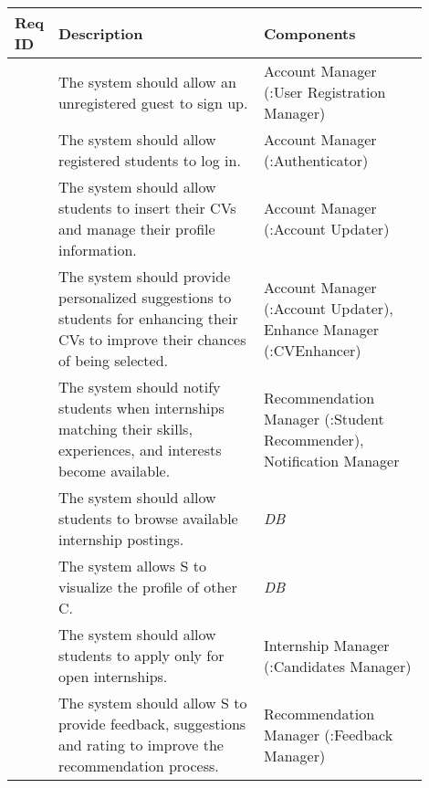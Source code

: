 \begin{center}
    \begin{longtable}{|l|p{0.5\linewidth}|p{0.4\linewidth}|}
        \hline
        \textbf{Req ID} & \textbf{Description} & \textbf{Components} \\
        \hline
        [R\creq] & The system should allow an unregistered guest to sign up. & Account Manager \newline (:User Registration Manager)\\
        \hline
        [R\creq] & The system should allow registered students to log in. & Account Manager \newline (:Authenticator)\\
        \hline
        [R\creq] & The system should allow students to insert their CVs and manage their profile information. & Account Manager \newline (:Account Updater)\\
        \hline
        [R\creq] & The system should provide personalized suggestions to students for enhancing their CVs to improve their chances of being selected. & Account Manager \newline (:Account Updater), \newline Enhance Manager \newline (:CVEnhancer) \\
        \hline
        [R\creq] & The system should notify students when internships matching their skills, experiences, and interests become available. & Recommendation Manager \newline (:Student Recommender), \newline Notification Manager\\
        \hline
        [R\creq] & The system should allow students to browse available internship postings. & \textit{DB}\\
        \hline
        [R\creq] & The system allows S to visualize the profile of other C. & \textit{DB}\\
        \hline
        [R\creq] & The system should allow students to apply only for open internships. & Internship Manager \newline (:Candidates Manager)\\
        \hline
        [R\creq] & The system should allow S to provide feedback, suggestions and rating to improve the recommendation process. & Recommendation Manager \newline (:Feedback Manager)\\
        \hline

\end{longtable}
\end{center}
